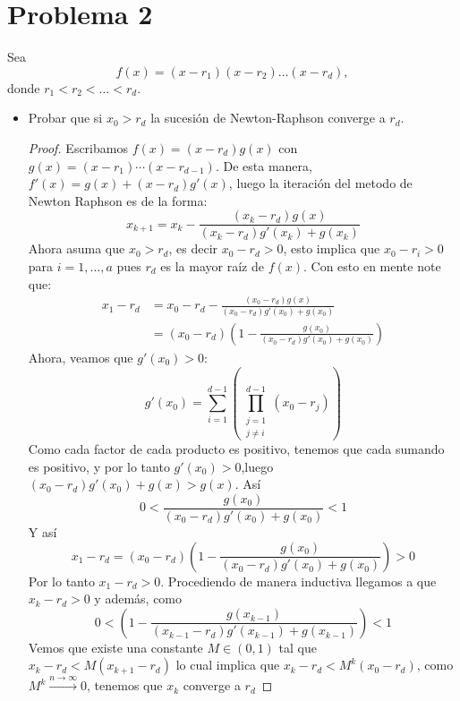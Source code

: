 
\section{Problema 2}
Sea
\[
f(x) = (x - r_1)(x - r_2) \dots (x - r_d),
\]
donde $r_1 < r_2 < \dots < r_d$.

\begin{itemize}
    \item Probar que si $x_0 > r_d$ la sucesión de Newton-Raphson converge a $r_d$.

    \begin{proof}
        Escribamos $f(x)=(x-r_d)g(x)$ con $g(x)=(x-r_1)\cdots (x-r_{d-1}).$ De esta manera, $f'(x)=g(x)+(x-r_d)g'(x)$, luego la iteración del metodo de Newton Raphson es de la forma:
         \[
         x_{k+1}=x_k-\frac{(x_k-r_d)g(x)}{(x_k-r_d)g'(x_k)+g(x_k)}
        \]
        Ahora asuma que $x_0>r_d$, es decir $x_0-r_d > 0$, esto implica que $x_0-r_i>0$ para $i=1,\ldots,a$ pues $r_d$ es la mayor raíz de $f(x)$. Con esto en mente note que:
        \begin{align*}
        x_1 - r_d &= x_0 - r_d - \frac{(x_0-r_d)g(x)}{(x_0-r_d)g'(x_0)+g(x_0)} \\ 
        &=(x_0 - r_d)\left(1-\frac{g(x_0)}{(x_0-r_d)g'(x_0)+g(x_0)}\right)
        \end{align*}
        Ahora, veamos que $g'(x_0)>0$:
        \[
        g'(x_0)=\sum_{i=1}^{d-1}\left(\prod_{\substack{j=1 \\ j \neq i}}^{d-1} (x_0 - r_j)\right)
        \]
        Como cada factor de cada producto es positivo, tenemos que cada sumando es positivo, y por lo tanto $g'(x_0) >0$,luego $(x_0-r_d)g'(x_0)+g(x)>g(x)$. Así
        \[
        0 < \frac{g(x_0)}{(x_0-r_d)g'(x_0)+g(x_0)} <1
        \]
        Y así
        \[
        x_1-r_d=(x_0 - r_d)\left(1-\frac{g(x_0)}{(x_0-r_d)g'(x_0)+g(x_0)}\right) >0
        \]
        Por lo tanto $x_1-r_d > 0$. Procediendo de manera inductiva llegamos a que $x_k - r_d >0$ y además, como
        \[
        0<\left(1-\frac{g(x_{k-1})}{(x_{k-1}-r_d)g'(x_{k-1})+g(x_{k-1})}\right) < 1
        \]
        Vemos que existe una constante $M \in (0,1)$ tal que $x_k - r_d<M(x_{k+1} - r_d)$ lo cual implica que $x_k-r_d < M^{k}(x_0 - r_d)$, como $M^{k}\xrightarrow{n\rightarrow \infty} 0$, tenemos que $x_k$ converge a $r_d$


\end{proof}
\end{itemize}
